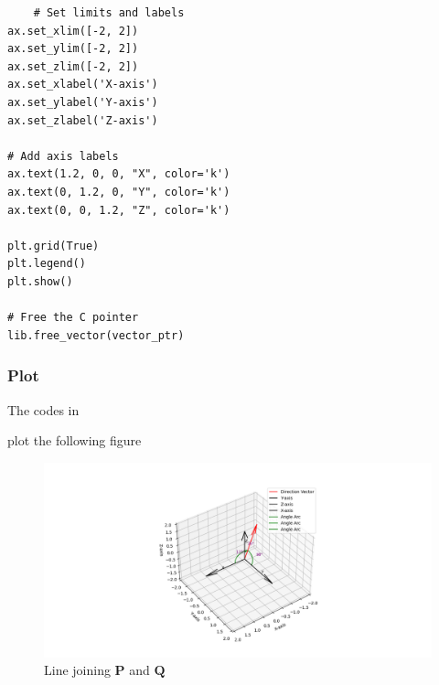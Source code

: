 \documentclass{beamer}
\theoremstyle{remark}
\let\vec\mathbf
\begin{document}
\begin{frame}[fragile]
 \begin{verbatim}
	# Set limits and labels
ax.set_xlim([-2, 2])
ax.set_ylim([-2, 2])
ax.set_zlim([-2, 2])
ax.set_xlabel('X-axis')
ax.set_ylabel('Y-axis')
ax.set_zlabel('Z-axis')

# Add axis labels
ax.text(1.2, 0, 0, "X", color='k')
ax.text(0, 1.2, 0, "Y", color='k')
ax.text(0, 0, 1.2, "Z", color='k')

plt.grid(True)
plt.legend()
plt.show()

# Free the C pointer
lib.free_vector(vector_ptr)
    \end{verbatim}
\end{frame}
	\begin{frame}
		\frametitle{Plot}
The codes in 
   \small

plot the following figure

			
    \begin{figure}[h!]
   \centering
   \includegraphics[width=\linewidth]{Figures/Figure_1.png}
	  \caption{Line joining $\vec{P}$ and $\vec{Q}$}
   \label{stemplot}
\end{figure}
\end{frame}

   
\end{document}
